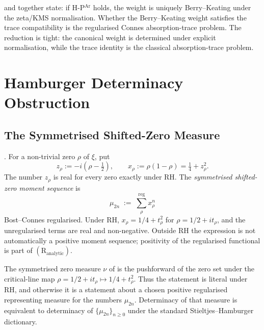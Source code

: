 \begin{remark}
\label{v4-arith:hpar-det:rem:weight-does-not-close}
 and
 together state: if
H-P\(^{\mathrm{Ar}}\) holds, the weight is uniquely Berry--Keating
under the zeta/KMS normalisation. Whether the Berry--Keating
weight satisfies the trace compatibility is the
regularised Connes absorption-trace problem. The reduction is
tight: the canonical weight is determined under explicit
normalisation, while the trace identity is the classical
absorption-trace problem.
\end{remark}

\section{Hamburger Determinacy Obstruction}
\label{v4-arith:hpar-det:determinacy}

\subsection{The Symmetrised Shifted-Zero Measure}
\label{v4-arith:hpar-det:symmetrised-measure}

\begin{definition}
\label{v4-arith:hpar-det:def:shifted-moments}
\ClaimStatusDefinitional. For a non-trivial zero \(\rho\) of \(\xi\),
put
\[
z_{\rho}:=-i(\rho-\tfrac12),\qquad x_{\rho}:=\rho(1-\rho)
       =\tfrac14+z_{\rho}^{2}.
\]
The number \(z_{\rho}\) is real for every zero exactly under RH. The
\emph{symmetrised shifted-zero moment sequence} is
\begin{equation}
\label{v4-arith:hpar-det:eq:mu-2n}
\mu_{2n}\;:=\;\sum_{\rho}^{\mathrm{reg}}x_{\rho}^{n}
\end{equation}
Bost--Connes regularised. Under RH, \(x_{\rho}=1/4+t_{\rho}^{2}\) for
\(\rho=1/2+it_{\rho}\), and the unregularised terms are real and
non-negative. Outside RH the expression is not automatically a positive
moment sequence; positivity of the regularised functional is part of
\((\mathrm{R}_{\mathrm{analytic}})\).
\end{definition}

\begin{remark}
\label{v4-arith:hpar-det:rem:measure-relation}
The symmetrised zero measure \(\nu\) of
 is the pushforward of the zero
set under the critical-line map
\(\rho=1/2+it_{\rho}\mapsto 1/4+t_{\rho}^{2}\).  Thus the statement is
literal under RH, and otherwise it is a statement about a chosen
positive regularised representing measure for the numbers
\(\mu_{2n}\).  Determinacy of that measure is equivalent to determinacy
of \(\{\mu_{2n}\}_{n\geq0}\) under the standard
Stieltjes--Hamburger dictionary.
\end{remark}

